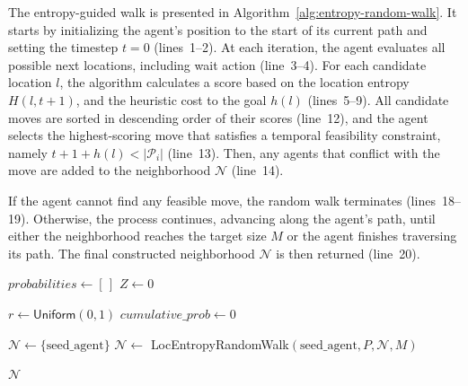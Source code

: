 \documentclass[review]{jair}
\begin{document}
The entropy-guided walk is presented in Algorithm~\ref{alg:entropy-random-walk}. It starts by initializing the agent's position to the start of its current path and setting the timestep \( t = 0 \) (lines~1--2). At each iteration, the agent evaluates all possible next locations, including wait action (line~3--4). 
For each candidate location \( l \), the algorithm calculates a score based on the location entropy \( H(l, t+1) \), and the heuristic cost to the goal $h(l)$ (lines~5--9).
All candidate moves are sorted in descending order of their scores (line~12), and the agent selects the highest-scoring move that satisfies a temporal feasibility constraint, namely \(t + 1 + h(l) < |\mathcal{P}_i|\) (line~13). Then, any agents that conflict with the move are added to the neighborhood \(\mathcal{N}\) (line~14).

If the agent cannot find any feasible move, the random walk terminates (lines~18--19). Otherwise, the process continues, advancing along the agent’s path, until either the neighborhood reaches the target size \(M\) or the agent finishes traversing its path. The final constructed neighborhood \(\mathcal{N}\) is then returned (line~20).


\begin{algorithm}[t]
\caption{Entropy-Based Neighborhood}
\label{alg:entropy-neighborhood}


$probabilities \gets [\,]$\;
$Z \gets 0$\;



$r \gets \textsf{Uniform}(0, 1)$\;
$cumulative\_prob \gets 0$\;


$\mathcal{N} \gets \{\text{seed\_agent}\}$\;
$\mathcal{N} \gets$ \textsf{LocEntropyRandomWalk}$(\text{seed\_agent}, P, \mathcal{N}, M)$\;

\Return $\mathcal{N}$\;
\end{algorithm}
\end{document}
